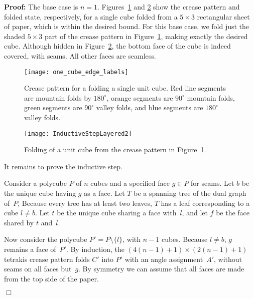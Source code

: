 \documentclass[11pt]{article}
\newcommand{\figlab}[1]{\label{fig:#1}}
\newcommand{\figref}[1]{\ref{fig:#1}}
\newenvironment{proof}{\noindent\textbf{Proof: }\ignorespaces}
  {\hspace*{\fill}$\Box$\medskip}
\begin{document}
\begin{proof}
  The base case is $n=1$.
  Figures~\figref{OneCubeCrease} and \figref{Extrusion} show the crease
  pattern and folded state, respectively, for a single cube folded from a
  $5 \times 3$ rectangular sheet of paper, which is within the desired bound.
  For this base case, we fold just the shaded $5 \times 3$ part of the crease
  pattern in Figure~\figref{OneCubeCrease}, making exactly the desired cube.
  Although hidden in Figure~\figref{Extrusion}, the bottom face of the
  cube is indeed covered, with seams.  All other faces are seamless.

\begin{figure}
\centering
\texttt{[image: one\_cube\_edge\_labels]}
\caption{Crease pattern for a folding a single unit cube.  Red line segments
  are mountain folds by $180^\circ$, orange segments are $90^\circ$ mountain
  folds, green segments are $90^\circ$ valley folds, and blue segments are
  $180^\circ$ valley folds.}
\figlab{OneCubeCrease}
\end{figure}


\begin{figure}
\centering
\texttt{[image: InductiveStepLayered2]}
\caption{Folding of a unit cube from the crease pattern
         in Figure~\protect\figref{OneCubeCrease}.}
\figlab{Extrusion}
\end{figure}


  It remains to prove the inductive step.

  Consider a polycube $P$ of $n$ cubes
  and a specified face $g \in P$ for seams.
  Let $b$ be the unique cube having $g$ as a face.
  Let $T$ be a spanning tree of the dual graph of~$P$,
  Because every tree has at least two leaves,
  $T$ has a leaf corresponding to a cube $l \neq b$.
  Let $t$ be the unique cube sharing a face with~$l$,
  and let $f$ be the face shared by $t$ and~$l$.

  Now consider the polycube $P' = P \setminus \{l\}$, with $n-1$ cubes.
  Because $l \neq b$, $g$ remains a face of~$P'$.
  By induction, the $(4(n-1)+1) \times (2(n-1)+1)$ tetrakis crease pattern
  folds $C'$ into $P'$ with an angle assignment~$A'$,
  without seams on all faces but~$g$.
  By symmetry we can assume that all faces are made
  from the top side of the paper.


\end{proof}
\end{document}
